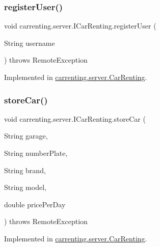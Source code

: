 \mbox{\label{interfacecarrenting_1_1server_1_1_i_car_renting_a2cc1d35537a158a56fcc8315ab18af77}} 
\subsubsection{\texorpdfstring{registerUser()}{registerUser()}}
{\footnotesize\ttfamily void carrenting.\+server.\+I\+Car\+Renting.\+register\+User (\begin{DoxyParamCaption}\item[{String}]{username }\end{DoxyParamCaption}) throws Remote\+Exception}



Implemented in \mbox{\hyperlink{classcarrenting_1_1server_1_1_car_renting_ae378b81a5c614b66474e89c26c513cb7}{carrenting.\+server.\+Car\+Renting}}.

\mbox{\label{interfacecarrenting_1_1server_1_1_i_car_renting_a45afd537059a13920f8ed9f91865b871}} 
\subsubsection{\texorpdfstring{storeCar()}{storeCar()}}
{\footnotesize\ttfamily void carrenting.\+server.\+I\+Car\+Renting.\+store\+Car (\begin{DoxyParamCaption}\item[{String}]{garage,  }\item[{String}]{number\+Plate,  }\item[{String}]{brand,  }\item[{String}]{model,  }\item[{double}]{price\+Per\+Day }\end{DoxyParamCaption}) throws Remote\+Exception}



Implemented in \mbox{\hyperlink{classcarrenting_1_1server_1_1_car_renting_a4a562c581946a77d814f10ee7c53b3f5}{carrenting.\+server.\+Car\+Renting}}.

